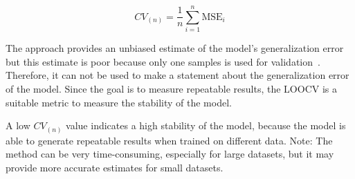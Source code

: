 \begin{tcolorbox}[arc=0pt,boxrule=0.5pt]
    \begin{equation}
        CV_{(n)} = \frac{1}{n} \sum_{i=1}^{n} \text{MSE}_{i}\label{eq:loocv}
    \end{equation}
\end{tcolorbox}

The approach provides an unbiased estimate of the model's generalization error
but this estimate is poor because only one samples is used for
validation~\cite[p.
201]{gareth2013introduction}.
Therefore, it can not be used to make a statement about the generalization
error of the model.
Since the goal is to measure repeatable results, the \ac{LOOCV} is a suitable
metric to measure
the stability of the model.

%

A low $CV_{(n)}$ value indicates a high stability of the model, because the
model is able to
generate repeatable results when trained on different data.
Note: The method can be very time-consuming, especially for large datasets,
but it may provide
more accurate estimates for small datasets.




